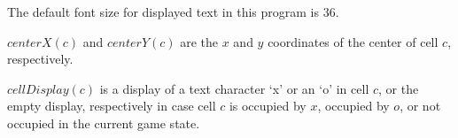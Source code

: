 \documentclass{../lib}
\begin{document}
\begin{ledCmnt}
The default font size for displayed text in this program is 36.
\end{ledCmnt}

\begin{ledDef}
\end{ledDef}

\begin{ledCmnt}
$centerX(c)$ and $centerY(c)$ are the $x$ and $y$ coordinates of the center of cell $c$, respectively.
\end{ledCmnt}

\begin{ledDef}
\end{ledDef}

\begin{ledDef}
\end{ledDef}

\begin{ledCmnt}
$cellDisplay(c)$ is a display of a text character `x' or an `o' in cell $c$, or the empty display, respectively in case cell $c$ is occupied by $x$, occupied by $o$, or not occupied in the current game state.
\end{ledCmnt}

\begin{ledDef}
\end{ledDef}

\begin{ledDef}
\end{ledDef}

\begin{ledDef}
\end{ledDef}
\end{document}

